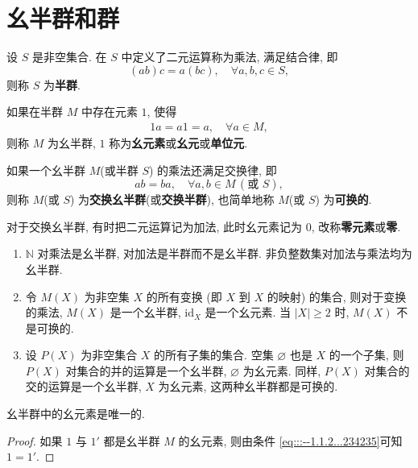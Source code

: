 \documentclass[../../main.tex]{subfiles}%
\begin{document}
\section{幺半群和群}

\begin{definition}[(幺)半群]
设 \( S \) 是非空集合. 在 \( S \) 中定义了二元运算称为乘法, 满足结合律, 即
\[
(ab)c = a(bc),\quad \forall a,b,c \in S ,
\]
则称 \( S \) 为\textbf{半群}.

如果在半群 \( M \) 中存在元素 \( 1 \), 使得
\begin{align}
1a = a1 = a,\quad \forall a \in M,\label{eq:::--1.1.2...234235}
\end{align}
则称 \( M \) 为幺半群, \( 1 \) 称为\textbf{幺元素}或\textbf{幺元}或\textbf{单位元}.

如果一个幺半群 \( M \)(或半群 \( S \)) 的乘法还满足交换律, 即
\[
ab = ba,\quad \forall a,b \in M \, (\text{或 } S) ,
\]
则称 \( M \)(或 \( S \)) 为\textbf{交换幺半群}(或\textbf{交换半群}), 也简单地称 \( M \)(或 \( S \)) 为\textbf{可换的}.

对于交换幺半群, 有时把二元运算记为加法, 此时幺元素记为 \( 0 \), 改称\textbf{零元素}或\textbf{零}.
\end{definition}

\begin{example}\label{example:抽象代数-例题1.2.2}
\begin{enumerate}[(1)]
\item \( \mathbb{N} \) 对乘法是幺半群, 对加法是半群而不是幺半群. 非负整数集对加法与乘法均为幺半群.

\item 令 \( M(X) \) 为非空集 \( X \) 的所有变换 (即 \( X \) 到 \( X \) 的映射) 的集合, 则对于变换的乘法, \( M(X) \) 是一个幺半群, \( \text{id}_X \) 是一个幺元素. 当 \( |X| \geqslant 2 \) 时, \( M(X) \) 不是可换的.

\item 设 \( P(X) \) 为非空集合 \( X \) 的所有子集的集合. 空集 \( \varnothing \) 也是 \( X \) 的一个子集, 则 \( P(X) \) 对集合的并的运算是一个幺半群, \( \varnothing \) 为幺元素. 同样, \( P(X) \) 对集合的交的运算是一个幺半群, \( X \) 为幺元素, 这两种幺半群都是可换的.
\end{enumerate}
\end{example}

\begin{proposition}
幺半群中的幺元素是唯一的.
\end{proposition}
\begin{proof}
如果 \( 1 \) 与 \( 1' \) 都是幺半群 \( M \) 的幺元素, 则由条件 \eqref{eq:::--1.1.2...234235}可知 \( 1 = 1' \). 
\end{proof}
\end{document}
